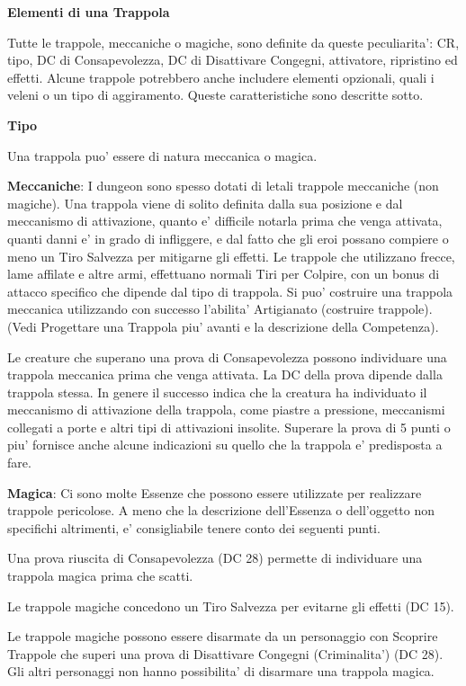 \documentclass[a4paper,11pt,twoside,openany]{book}
\begin{document}
{\textbf{Elementi di una Trappola}

Tutte le trappole, meccaniche o magiche, sono definite da queste peculiarita': CR, tipo, DC di Consapevolezza, DC di Disattivare Congegni, attivatore, ripristino ed effetti. Alcune trappole potrebbero anche includere elementi opzionali, quali i veleni o un tipo di aggiramento. Queste caratteristiche sono descritte sotto.

\textbf{Tipo}

Una trappola puo' essere di natura meccanica o magica.

\textbf{Meccaniche}: I dungeon sono spesso dotati di letali trappole meccaniche (non magiche). Una trappola viene di solito definita dalla sua posizione e dal meccanismo di attivazione, quanto e' difficile notarla prima che venga attivata, quanti danni e' in grado di infliggere, e dal fatto che gli eroi possano compiere o meno un Tiro Salvezza per mitigarne gli effetti. Le trappole che utilizzano frecce, lame affilate e altre armi, effettuano normali Tiri per Colpire, con un bonus di attacco specifico che dipende dal tipo di trappola. Si puo' costruire una trappola meccanica utilizzando con successo l'abilita' Artigianato (costruire trappole). (Vedi Progettare una Trappola piu' avanti e la descrizione della Competenza).

Le creature che superano una prova di Consapevolezza possono individuare una trappola meccanica prima che venga attivata. La DC della prova dipende dalla trappola stessa. In genere il successo indica che la creatura ha individuato il meccanismo di attivazione della trappola, come piastre a pressione, meccanismi collegati a porte e altri tipi di attivazioni insolite. Superare la prova di 5 punti o piu' fornisce anche alcune indicazioni su quello che la trappola e' predisposta a fare.

\textbf{Magica}: Ci sono molte Essenze che possono essere utilizzate per realizzare trappole pericolose. A meno che la descrizione dell'Essenza o dell'oggetto non specifichi altrimenti, e' consigliabile tenere conto dei seguenti punti.

Una prova riuscita di Consapevolezza (DC 28) permette di individuare una trappola magica prima che scatti.

Le trappole magiche concedono un Tiro Salvezza per evitarne gli effetti (DC 15).

Le trappole magiche possono essere disarmate da un personaggio con Scoprire Trappole che superi una prova di Disattivare Congegni (Criminalita') (DC 28). Gli altri personaggi non hanno possibilita' di disarmare una trappola magica.

}
\end{document}
